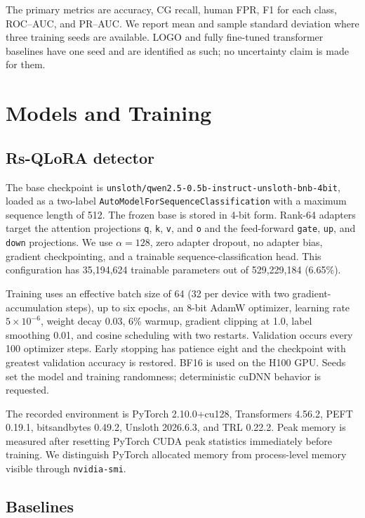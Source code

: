 \documentclass[utf8]{FrontiersinHarvard}
\begin{document}
The primary metrics are accuracy, CG recall, human FPR, F1 for each class, ROC--AUC, and PR--AUC. We report mean and sample standard deviation where three training seeds are available. LOGO and fully fine-tuned transformer baselines have one seed and are identified as such; no uncertainty claim is made for them.

\section{Models and Training}

\subsection{Rs-QLoRA detector}

The base checkpoint is \texttt{unsloth/qwen2.5-0.5b-instruct-unsloth-bnb-4bit}, loaded as a two-label \texttt{AutoModelForSequenceClassification} with a maximum sequence length of 512. The frozen base is stored in 4-bit form. Rank-64 adapters target the attention projections \texttt{q}, \texttt{k}, \texttt{v}, and \texttt{o} and the feed-forward \texttt{gate}, \texttt{up}, and \texttt{down} projections. We use $\alpha=128$, zero adapter dropout, no adapter bias, gradient checkpointing, and a trainable sequence-classification head. This configuration has 35,194,624 trainable parameters out of 529,229,184 (6.65\%).

Training uses an effective batch size of 64 (32 per device with two gradient-accumulation steps), up to six epochs, an 8-bit AdamW optimizer, learning rate $5\times10^{-6}$, weight decay 0.03, 6\% warmup, gradient clipping at 1.0, label smoothing 0.01, and cosine scheduling with two restarts. Validation occurs every 100 optimizer steps. Early stopping has patience eight and the checkpoint with greatest validation accuracy is restored. BF16 is used on the H100 GPU. Seeds set the model and training randomness; deterministic cuDNN behavior is requested.

The recorded environment is PyTorch 2.10.0+cu128, Transformers 4.56.2, PEFT 0.19.1, bitsandbytes 0.49.2, Unsloth 2026.6.3, and TRL 0.22.2. Peak memory is measured after resetting PyTorch CUDA peak statistics immediately before training. We distinguish PyTorch allocated memory from process-level memory visible through \texttt{nvidia-smi}.

\subsection{Baselines}
\end{document}
